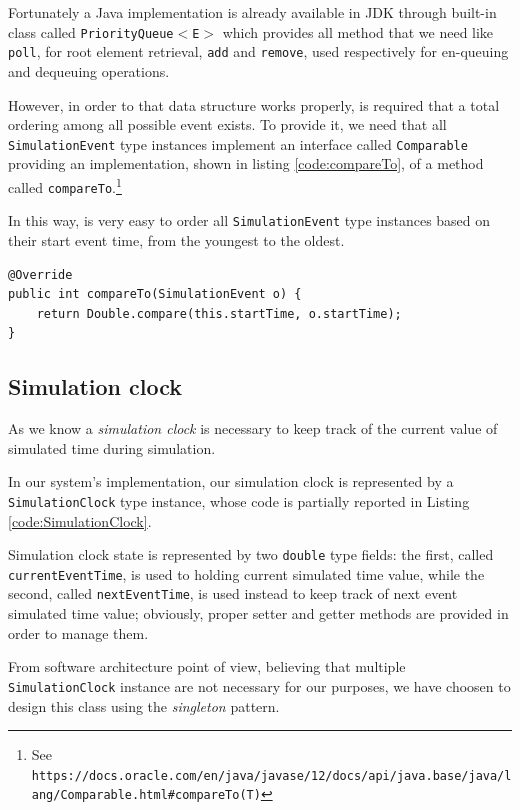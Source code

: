 \documentclass[10pt,a4paper]{article}
\begin{document}
Fortunately a Java implementation is already available in JDK through built-in class called \texttt{PriorityQueue$<$E$>$} which provides all method that we need like \texttt{poll}, for root element retrieval, \texttt{add} and \texttt{remove}, used respectively for en-queuing and dequeuing operations.

However, in order to that data structure works properly, is required that a total ordering among all possible event exists. To provide it, we need that all \texttt{SimulationEvent} type instances implement an interface called \texttt{Comparable} providing an implementation, shown in listing \ref{code:compareTo}, of a method called \texttt{compareTo}.\footnote{See \texttt{https://docs.oracle.com/en/java/javase/12/docs/api/java.base/java/lang/Comparable.html\#compareTo(T)}}

In this way, is very easy to order all \texttt{SimulationEvent} type instances based on their start event time, from the youngest to the oldest. 

\begin{lstlisting}[frame=lines, caption={Snippet of \texttt{compareTo} method implementation}, label={code:compareTo}]
@Override
public int compareTo(SimulationEvent o) {
	return Double.compare(this.startTime, o.startTime);
}
\end{lstlisting}

\subsection{Simulation clock}

As we know a \textit{simulation clock} is necessary to keep track of the current value of simulated time during simulation. 

In our system's implementation, our simulation clock is represented by a \texttt{SimulationClock} type instance, whose code is partially reported in Listing \ref{code:SimulationClock}. 

Simulation clock state is represented by two \texttt{double} type fields: the first, called \texttt{currentEventTime}, is used to holding current simulated time value, while the second, called \texttt{nextEventTime}, is used instead to keep track of next event simulated time value; obviously, proper setter and getter methods are provided in order to manage them.

From software architecture point of view, believing that multiple \texttt{Simulation\-Clock} instance are not necessary for our purposes, we have choosen to design this class using the \textit{singleton} pattern. 
\end{document}
